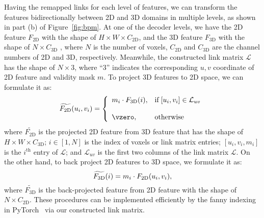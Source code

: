 \documentclass[final]{cvpr}
\begin{document}
Having the remapped links for each level of features, we can transform the features bidirectionally between 2D and 3D domains in multiple levels, as shown in part (b) of Figure~\ref{fig:bpm}.
At one of the decoder levels, we have the 2D feature $F_\text{2D}$ with the shape of $H \times W\times C_\text{2D}$, and the 3D feature $F_\text{3D}$ with the shape of  $N \times C_\text{3D}$ , where $N$ is the number of voxels, $C_\text{2D}$ and $C_\text{3D}$ are the channel numbers of 2D and 3D, respectively.
Meanwhile, the constructed link matrix $\mathcal{L}$ has the shape of $N \times 3$, where ``$3$'' indicates the corresponding $u,v$ coordinate of 2D feature and validity mask $m$.
To project 3D features to 2D space, we can formulate it as:
\begin{equation}
	\widetilde{F_\text{2D}}(u_i,v_i) = \left \{
	\begin{array}{ll}
		{m_i \cdot F_\text{3D}(i)}, & \text{if}\; [u_i,v_i]  \in \mathcal{L}_{uv}            \\
		
		\\
		{\vzero}, & \text{otherwise}
	\end{array}
	\right.
\vspace{-2mm}
\end{equation}
where $\widetilde{F_\text{2D}}$ is the projected 2D feature from 3D feature that has the shape of $H \times W \times C_\text{3D}$; $i \in [1,N]$ is the index of voxels or link matrix entries; $[u_i,v_i,m_i]$  is the $i^{\text{th}}$ entry of $\mathcal{L}$; and $\mathcal{L}_{uv}$ is the first two columns of the link matrix $\mathcal{L}$.
On the other hand, to back project 2D features to 3D space, we formulate it as:
	\vspace{-1mm}
\begin{equation}
	\widetilde{F_\text{3D}}(i) = m_i  \cdot  F_\text{2D}(u_i,v_i),
	\vspace{-2mm}
\end{equation}
where $\widetilde{F_\text{3D}}$ is the back-projected feature from 2D feature with the shape of $N \times C_\text{2D}$.
These procedures can be implemented efficiently by the fanny indexing in PyTorch~\cite{paszke2019pytorch} via our constructed link matrix.



\vspace{-5mm}
\end{document}

